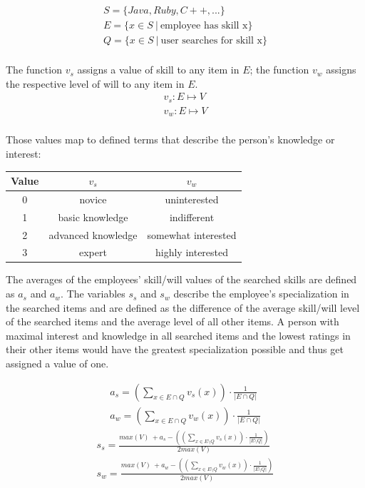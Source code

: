 \begin{gather*}
  S = \{Java, Ruby, C++, ...\} \\
  E = \{x \in S \ | \ \textrm{employee has skill x}\} \\
  Q = \{x \in S \ | \ \textrm{user searches for skill x}\} \\
\end{gather*}

The function $v_s$ assigns a value of skill to any item in $E$; the function $v_w$ assigns the respective level of will to any item in $E$.
\begin{gather*}
  v_s: E \mapsto V \\
  v_w: E \mapsto V \\
\end{gather*}

Those values map to defined terms that describe the person's knowledge or interest:
\begin{center}
\begin{tabular}{c|c|c}
	Value & $v_s$ & $v_w$ \\
	\hline
	0 & novice & uninterested\\
	1 & basic knowledge & indifferent\\
	2 & advanced knowledge & somewhat interested\\
	3 & expert & highly interested\\
\end{tabular}
\end{center}

\newpage

The averages of the employees' skill/will values of the searched skills are defined as $a_s$ and $a_w$.
The variables $s_s$ and $s_w$ describe the employee's specialization in the searched items and are defined as the difference
of the average skill/will level of the searched items and the average level of all other items.
A person with maximal interest and knowledge in all searched items and the lowest ratings in their other items would have the greatest specialization possible and thus get assigned a value of one.

\begin{gather*}
  a_s = \left( \sum_{x \in E \cap Q} v_s(x) \right) \cdot \frac{1}{|E \cap Q|} \\
  a_w = \left( \sum_{x \in E \cap Q} v_w(x) \right) \cdot \frac{1}{|E \cap Q|}
\end{gather*}
\begin{gather*}
  s_s = \frac{max(V) \ + a_s - \left( \left( \sum_{x \in E \setminus Q} v_s(x)\right) \cdot \frac{1}{|E \setminus Q|} \right)}{2 max(V)}\\
  s_w = \frac{max(V) \ + a_w - \left( \left( \sum_{x \in E \setminus Q} v_w(x)\right) \cdot \frac{1}{|E \setminus Q|} \right)}{2 max(V)}
\end{gather*}

